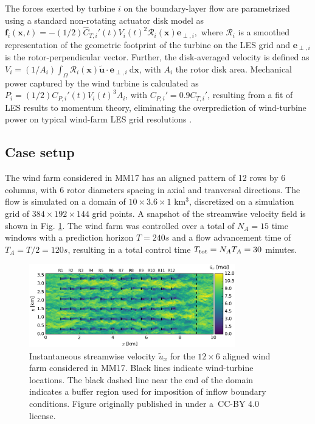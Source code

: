 \documentclass[wes, manuscript]{copernicus}
\newcommand{\bs}[1]{\boldsymbol{#1}}
\newcommand{\dx}{\text{d}\boldsymbol{x}}
\newcommand{\sint}{\int_{\Omega}}
\newcommand{\utilde}{\widetilde{\bs{u}}}
\newcommand{\R}{\mathscr{R}}
\newcommand{\eperpi}{\bs{e}_{\perp,i}}
\begin{document}
The forces exerted by turbine $i$ on the boundary-layer flow are parametrized using a standard non-rotating actuator disk model as
$	\bs{f}_i(\bs{x},t) = - (1/2) \widehat{C}_{T,i}'(t) V_i(t)^2 \R_i (\bs{x}) \eperpi,$
where $\R_i$ is a smoothed representation of the geometric footprint of the turbine on the LES grid and $\eperpi$ is the rotor-perpendicular vector. Further, the disk-averaged velocity is defined as $V_i = (1/A_i) \sint \R_i(\bs{x}) \utilde \cdot \eperpi ~\dx$, with $A_i$ the rotor disk area. Mechanical power captured by the wind turbine is calculated as $P_i = (1/2) C_{P,i}'(t) V_i(t)^3 A_i$, with $C_{P,i}' = 0.9 C_{T,i}'$, resulting from a fit of LES results to momentum theory, eliminating the overprediction of wind-turbine power on typical wind-farm LES grid resolutions \citep{munters2017optimal}.  

\subsection{Case setup}
The wind farm considered in MM17 has an aligned pattern of 12 rows by 6 columns, with 6 rotor diameters spacing in axial and tranversal directions. The flow is simulated on a domain of $10 \times 3.6 \times 1$ km$^3$, discretized on a simulation grid of $384 \times 192 \times 144$ grid points. A snapshot of the streamwise velocity field is shown in Fig. \ref{fig:flowfield_MM17}. The wind farm was controlled over a total of $N_A = 15$ time windows with a prediction horizon $T = 240 s$ and a flow advancement time of $T_A = T/2 = 120 s$, resulting in a total control time $T_{\rm tot} = N_A T_A = 30$ minutes. 

\begin{figure}
	\includegraphics[width=0.8\textwidth]{flowfield_MM17}
	\caption{Instantaneous streamwise velocity $\widetilde{u}_x$ for the $12 \times 6$ aligned wind farm considered in MM17. Black lines indicate wind-turbine locations. The black dashed line near the end of the domain indicates a buffer region used for imposition of inflow boundary conditions. Figure originally published in \cite{munters2017optimal} under a~CC-BY 4.0 license.\label{fig:flowfield_MM17}}
\end{figure}
\end{document}

